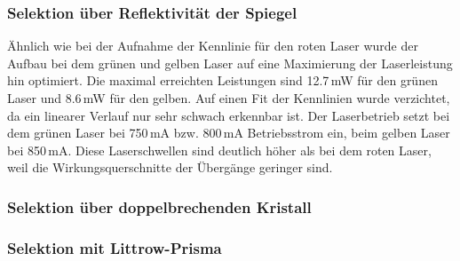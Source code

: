 \subsubsection{Selektion über Reflektivität der Spiegel}

Ähnlich wie bei der Aufnahme der Kennlinie für den roten Laser wurde der Aufbau bei dem grünen und
gelben Laser auf eine Maximierung der Laserleistung hin optimiert.
Die maximal erreichten Leistungen sind 12.7\,mW für den grünen Laser und 8.6\,mW für den gelben.
Auf einen Fit der Kennlinien wurde verzichtet,
da ein linearer Verlauf nur sehr schwach erkennbar ist.
Der Laserbetrieb setzt bei dem grünen Laser bei 750\,mA bzw. 800\,mA Betriebsstrom ein,
beim gelben Laser bei 850\,mA.
Diese Laserschwellen sind deutlich höher als bei dem roten Laser,
weil die Wirkungsquerschnitte der Übergänge geringer sind.

\subsubsection{Selektion über doppelbrechenden Kristall}

\subsubsection{Selektion mit Littrow-Prisma}
